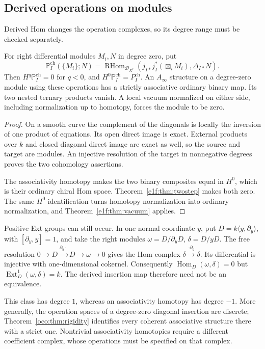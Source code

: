 \subsection{Derived operations on modules}

Derived Hom changes the operation complexes, so its degree
range must be checked separately.

\begin{proposition}
\label{e1f:prop:derived-heart}
For right differential modules \(M_i,N\) in degree zero, put
\[
 \mathbb P_I^{\mathrm{ch}}(\{M_i\};N)
 =\operatorname{RHom}_{\mathcal D_{X^I}}
 \left(j_{I*}j_I^*(\boxtimes_iM_i),\Delta_{I*}N\right).
\]
Then \(H^q\mathbb P_I^{\mathrm{ch}}=0\) for \(q<0\), and
\(H^0\mathbb P_I^{\mathrm{ch}}=P_I^{\mathrm{ch}}\).
An \(A_\infty\) structure on a degree-zero module using these
operations has a strictly associative ordinary binary map.
Its two nested ternary products vanish. A local vacuum
normalized on either side, including normalization up to
homotopy, forces the module to be zero.
\end{proposition}

\begin{proof}
On a smooth curve the complement of the diagonals is locally
the inversion of one product of equations. Its open direct
image is exact. External products over \(k\) and closed
diagonal direct image are exact as well, so the source and
target are modules. An injective resolution of the target in
nonnegative degrees proves the two cohomology assertions.

The associativity homotopy makes the two binary composites
equal in \(H^0\), which is their ordinary chiral Hom space.
Theorem~\ref{e1f:thm:twostep} makes both zero. The same
\(H^0\) identification turns homotopy normalization into
ordinary normalization, and
Theorem~\ref{e1f:thm:vacuum} applies.
\end{proof}

\begin{remark}\label{e1f:rem:derived}
Positive Ext groups can still occur. In one normal coordinate
\(y\), put \(D=k\langle y,\partial_y\rangle\), with
\([\partial_y,y]=1\), and take the right modules
\(\omega=D/\partial_yD\), \(\delta=D/yD\).
The free resolution
\(0\to D\xrightarrow{\partial_y\cdot}D\to\omega\to0\)
gives the Hom complex
\(\delta\xrightarrow{\cdot\partial_y}\delta\).
Its differential is injective with one-dimensional cokernel.
Consequently \(\operatorname{Hom}_D(\omega,\delta)=0\) but
\(\operatorname{Ext}^1_D(\omega,\delta)=k\).
The derived insertion map therefore need not be an equivalence.

This class has degree \(1\), whereas an associativity
homotopy has degree \(-1\). More generally, the operation
spaces of a degree-zero diagonal insertion are discrete;
Theorem~\ref{oco:thm:rigidity} identifies every coherent
associative structure there with a strict one. Nontrivial
associativity homotopies require a different coefficient
complex, whose operations must be specified on that complex.
\end{remark}

